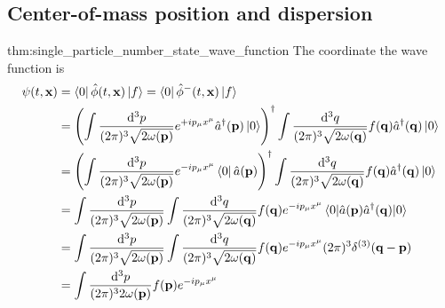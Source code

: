 \subsection{Center-of-mass position and dispersion}

\begin{delayedproof}{thm:single_particle_number_state_wave_function}
	The coordinate the wave function is
	\begin{equation}
		\begin{split}
			\psi(t,\vb{x})
			&=
			\bra{0}
			\hat\phi(t,\vb{x})
			\ket{f}
			=
			\bra{0}
			\hat\phi^-(t,\vb{x})
			\ket{f}
			\\
			&=
			\left(
				\int\frac{\dd[3]{p}}{(2\pi)^3\sqrt{2\omega(\vb{p})}}
				e^{+ip_\mu x^\mu}
				\hat{a}^\dagger(\vb{p})
				\ket{0}
			\right)^\dagger
			\int\frac{\dd[3]{q}}{(2\pi)^3\sqrt{2\omega(\vb{q})}}
			f(\vb{q})
			\hat{a}^\dagger(\vb{q})
			\ket{0}
			\\
			&=
			\left(
				\int\frac{\dd[3]{p}}{(2\pi)^3\sqrt{2\omega(\vb{p})}}
				e^{-ip_\mu x^\mu}
				\bra{0}
				\hat{a}(\vb{p})
			\right)^\dagger
			\int\frac{\dd[3]{q}}{(2\pi)^3\sqrt{2\omega(\vb{q})}}
			f(\vb{q})
			\hat{a}^\dagger(\vb{q})
			\ket{0}
			\\
			&=
			\int\frac{\dd[3]{p}}{(2\pi)^3\sqrt{2\omega(\vb{p})}}
			\int\frac{\dd[3]{q}}{(2\pi)^3\sqrt{2\omega(\vb{q})}}
			f(\vb{q})
			e^{-ip_\mu x^\mu}
			\expval{\hat{a}(\vb{p})\hat{a}^\dagger(\vb{q})}{0}
			\\
			&=
			\int\frac{\dd[3]{p}}{(2\pi)^3\sqrt{2\omega(\vb{p})}}
			\int\frac{\dd[3]{q}}{(2\pi)^3\sqrt{2\omega(\vb{q})}}
			f(\vb{q})
			e^{-ip_\mu x^\mu}
			(2\pi)^3
			\delta^{(3)}(\vb{q}-\vb{p})
			\\
			&=
			\int\frac{\dd[3]{p}}{(2\pi)^32\omega(\vb{p})}
			f(\vb{p})
			e^{-ip_\mu x^\mu}
		\end{split}
	\end{equation}
\end{delayedproof}


